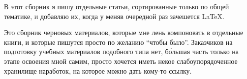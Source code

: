 
В этот сборник я пишу отдельные статьи, сортированные только по общей тематике,
и добавляю их, когда у меняв очередной раз зачешется \LaTeX.

Это сборник черновых материалов, которые мне лень компоновать в отдельные
книги, и которые пишутся просто по желанию ``чтобы было''. Заказчиков на
подготовку учебных материалов подобного типа нет, б\`{о}льшая часть только на
этапе освоения мной самим, просто хочется иметь некое
слабоупорядоченное хранилище наработок, на которое можно дать кому-то ссылку.

